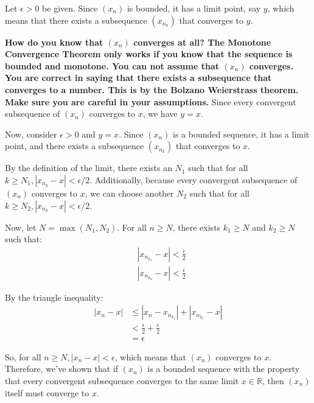 \documentclass{report}
\begin{document}
\pagebreak



Let $\epsilon>0$ be given. Since $\left(x_n\right)$ is bounded, it has a limit point, say $y$, which means that there exists a subsequence $\left(x_{n_k}\right)$ that converges to $y$. 

\textbf{
How do you know that $(x_n)$ converges at all? The Monotone Convergence Theorem only works if you know that the sequence is bounded and monotone. You can not assume that $(x_n)$ converges. You are correct in saying that there exists a subsequence that converges to a number. This is by the Bolzano Weierstrass theorem. Make sure you are careful in your assumptions.
}
Since every convergent subsequence of $\left(x_n\right)$ converges to $x$, we have $y=x$.

Now, consider $\epsilon>0$ and $y=x$. Since $\left(x_n\right)$ is a bounded sequence, it has a limit point, and there exists a subsequence $\left(x_{n_k}\right)$ that converges to $x$.

By the definition of the limit, there exists an $N_1$ such that for all $k \geq N_1,\left|x_{n_{k}}-x\right|<\epsilon / 2$.
Additionally, because every convergent subsequence of $\left(x_n\right)$ converges to $x$, we can choose another $N_2$ such that for all $k \geq N_2,\left|x_{n_k}-x\right|<\epsilon / 2$.

Now, let $N=\max \left(N_1, N_2\right)$. For all $n \geq N$, there exists $k_1 \geq N$ and $k_2 \geq N$ such that:
$$
\begin{aligned}
& \left|x_{n_{k_1}}-x\right|<\frac{\epsilon}{2} \\
& \left|x_{n_{k_2}}-x\right|<\frac{\epsilon}{2}
\end{aligned}
$$

By the triangle inequality:
$$
\begin{aligned}
\left|x_n-x\right| & \leq\left|x_n-x_{n_{k_1}}\right|+\left|x_{n_{k_1}}-x\right| \\
& <\frac{\epsilon}{2}+\frac{\epsilon}{2} \\
& =\epsilon
\end{aligned}
$$

So, for all $n \geq N,\left|x_n-x\right|<\epsilon$, which means that $\left(x_n\right)$ converges to $x$.
Therefore, we've shown that if $\left(x_n\right)$ is a bounded sequence with the property that every convergent subsequence converges to the same limit $x \in \mathbb{R}$, then $\left(x_n\right)$ itself must converge to $x$.
\end{document}
